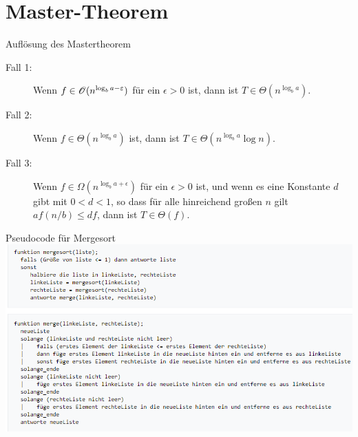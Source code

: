 \documentclass{beamer}
\begin{document}
\section{Master-Theorem}
\begin{frame}
	\begin{block}{Auflösung des Mastertheorem}
	\begin{description}
		\item[Fall 1:] Wenn $f \in \mathscr{O}(n^{\log_b a -\varepsilon})$ für ein
		$\epsilon>0$ ist, dann ist $T\in \Theta(n^{\log_b a})$.
		\item[Fall 2:] Wenn $f \in \Theta(n^{\log_b a})$ ist, dann ist
		$T\in \Theta(n^{\log_b a}\log n)$.
		\item[Fall 3:] Wenn $f \in \Omega(n^{\log_b a +\epsilon})$ für ein
		$\epsilon>0$ ist, und wenn es eine Konstante $d$ gibt mit $0<d<1$, so
		dass für alle hinreichend großen $n$ gilt $af(n/b)\leq d f$, dann
		ist $T\in \Theta(f)$.
	\end{description}
\end{block}
\end{frame}

\begin{frame}{Pseudocode für Mergesort}
\includegraphics[scale=0.5]{Pseudo.png}
\end{frame}

\end{document}
